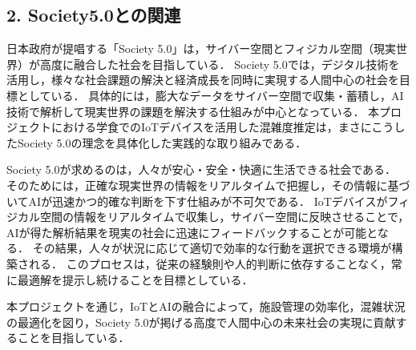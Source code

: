 \subsection*{2. Society5.0との関連}
日本政府が提唱する「Society 5.0」は，サイバー空間とフィジカル空間（現実世界）が高度に融合した社会を目指している．
Society 5.0では，デジタル技術を活用し，様々な社会課題の解決と経済成長を同時に実現する人間中心の社会を目標としている．
具体的には，膨大なデータをサイバー空間で収集・蓄積し，AI技術で解析して現実世界の課題を解決する仕組みが中心となっている．
本プロジェクトにおける学食でのIoTデバイスを活用した混雑度推定は，まさにこうしたSociety 5.0の理念を具体化した実践的な取り組みである．

Society 5.0が求めるのは，人々が安心・安全・快適に生活できる社会である．
そのためには，正確な現実世界の情報をリアルタイムで把握し，その情報に基づいてAIが迅速かつ的確な判断を下す仕組みが不可欠である．
IoTデバイスがフィジカル空間の情報をリアルタイムで収集し，サイバー空間に反映させることで，AIが得た解析結果を現実の社会に迅速にフィードバックすることが可能となる．
その結果，人々が状況に応じて適切で効率的な行動を選択できる環境が構築される．
このプロセスは，従来の経験則や人的判断に依存することなく，常に最適解を提示し続けることを目標としている．

本プロジェクトを通じ，IoTとAIの融合によって，施設管理の効率化，混雑状況の最適化を図り，Society 5.0が掲げる高度で人間中心の未来社会の実現に貢献することを目指している．








%
%
